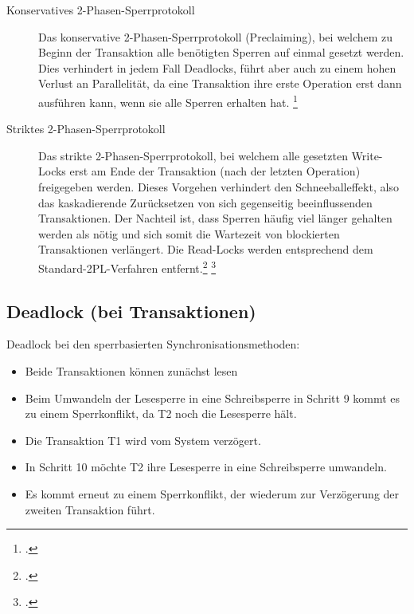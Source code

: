 \documentclass{bschlangaul-theorie}
\begin{document}
\begin{description}

\item[Konservatives 2-Phasen-Sperrprotokoll]

Das konservative 2-Phasen-Sperrprotokoll (Preclaiming), bei welchem zu
Beginn der Transaktion alle benötigten Sperren auf einmal gesetzt
werden. Dies verhindert in jedem Fall Deadlocks, führt aber auch zu
einem hohen Verlust an Parallelität, da eine Transaktion ihre erste
Operation erst dann ausführen kann, wenn sie alle Sperren erhalten hat.
\footcite[11.7.2 Preclaiming zur Vermeidung von Verklemmungen, Seite 350]{kemper}

\item[Striktes 2-Phasen-Sperrprotokoll]

Das strikte 2-Phasen-Sperrprotokoll, bei welchem alle gesetzten
Write-Locks erst am Ende der Transaktion (nach der letzten Operation)
freigegeben werden. Dieses Vorgehen verhindert den Schneeballeffekt,
also das kaskadierende Zurücksetzen von sich gegenseitig beeinflussenden
Transaktionen. Der Nachteil ist, dass Sperren häufig viel länger
gehalten werden als nötig und sich somit die Wartezeit von blockierten
Transaktionen verlängert. Die Read-Locks werden entsprechend dem
Standard-2PL-Verfahren entfernt.\footcite[11.6.3 Kaskadierendes Rücksetzen, Seite 348]{kemper}
\footcite{wiki:sperrverfahren}
\end{description}

%

\subsection{Deadlock (bei Transaktionen)}

Deadlock bei den sperrbasierten Synchronisationsmethoden:

\begin{itemize}
\item Beide Transaktionen können zunächst lesen

\item Beim Umwandeln der Lesesperre in eine Schreibsperre in Schritt 9
kommt es zu einem Sperrkonflikt, da T2 noch die Lesesperre hält.

\item Die Transaktion T1 wird vom System verzögert.

\item In Schritt 10 möchte T2 ihre Lesesperre in eine Schreibsperre
umwandeln.

\item Es kommt erneut zu einem Sperrkonflikt, der wiederum zur
Verzögerung der zweiten Transaktion führt.
\end{itemize}
\end{document}
